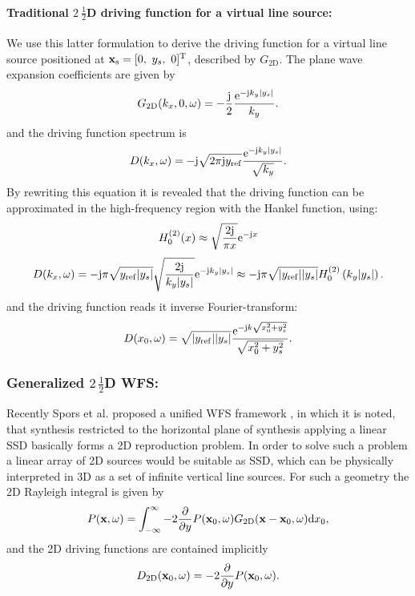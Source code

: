 \paragraph{Traditional $2~\frac{1}{2}$D driving function for a virtual line source:\\}
We use this latter formulation to derive the driving function for a virtual line source positioned at $\vxs = [0,\ y_s,\ 0]^{\mathrm{T}}$, described by $G_{\mathrm{2D}}$.
The plane wave expansion coefficients are given by
\begin{equation}
G_{\mathrm{2D}}(k_x,0,\omega) = -\frac{\mathrm{j}}{2} \frac{\mathrm{e}^{-\mathrm{j} k_y |y_s|}}{k_y}.
\end{equation}
and the driving function spectrum is
\begin{equation}
D(k_x,\omega) =  - \mathrm{j} \sqrt{2\pi \mathrm{j} y_{\mathrm{ref}} }\frac{\mathrm{e}^{-\mathrm{j} k_y |y_s|}}{\sqrt{k_y}}.
\end{equation}
By rewriting this equation it is revealed that the driving function can be approximated in the high-frequency region with the Hankel function, using:
\begin{equation}
H_0^{(2)}(x) \approx \sqrt{\frac{2\mathrm{j}}{\pi x}}\mathrm{e}^{-\mathrm{j} x}
\end{equation}
\begin{equation}
D(k_x,\omega) =  -\mathrm{j} \pi \sqrt{ y_{\mathrm{ref}} |y_s|} \sqrt{\frac{2 \mathrm{j}}{k_y |y_s|}} \mathrm{e}^{-\mathrm{j} k_y |y_s|} \approx -\mathrm{j} \pi \sqrt{|y_{\mathrm{ref}}| |y_s|} H_{0}^{(2)}\left( k_y |y_s| \right).
\end{equation}
and the driving function reads it inverse Fourier-transform:
\begin{equation}
D(x_0,\omega) = \sqrt{|y_{\mathrm{ref}}| |y_s|} \frac{\mathrm{e}^{-\mathrm{j} k \sqrt{x_0^2 + y_s^2}}}{\sqrt{x_0^2 + y_s^2}}.
\end{equation}

\subsubsection{Generalized $2\, \frac{1}{2}$D WFS:\\}

Recently Spors et al. proposed a unified WFS framework \cite{Spors2008:WFSrevisited, Ahrens2012},
in which it is noted, that synthesis restricted to the horizontal plane of synthesis applying a linear SSD basically forms a 2D reproduction problem. In order to solve such a problem a linear array of 2D sources would be suitable as SSD, which can be physically interpreted in 3D as a set of infinite vertical line sources.
For such a geometry the 2D Rayleigh integral is given by
\begin{equation}
P(\mathbf{x},\omega) = \int_{-\infty}^{\infty} -2\frac{\partial}{\partial y} P(\mathbf{x}_0,\omega) G_{\mathrm{2D}}(\mathbf{x}-\mathbf{x}_0, \omega) \mathrm{d} x_0,
\end{equation}
and the 2D driving functions are contained implicitly
\begin{equation}
D_{\mathrm{2D}}(\mathbf{x}_0,\omega) = -2\frac{\partial}{\partial y} P(\mathbf{x}_0,\omega).
\label{Eq:Theory:2D_WFS_driv_fun}
\end{equation}

